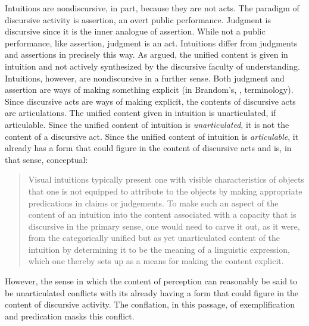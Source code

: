 \documentclass[12pt]{article}
\begin{document}
Intuitions are nondiscursive, in part, because they are not acts. The paradigm of discursive activity is assertion, an overt public performance. Judgment is discursive since it is the inner analogue of assertion. While not a public performance, like assertion, judgment is an act. Intuitions differ from judgments and assertions in precisely this way. As \citet[chapter 9]{Prichard:1909yg} argued, the unified content is given in intuition and not actively synthesized by the discursive faculty of understanding. Intuitions, however, are nondiscursive in a further sense. Both judgment and assertion are ways of making something explicit (in Brandom's, \citeyear{Brandom:1994fk}, terminology). Since discursive acts are ways of making explicit, the contents of discursive acts are articulations. The unified content given in intuition is unarticulated, if articulable. Since the unified content of intuition is \emph{unarticulated}, it is not the content of a discursive act. Since the unified content of intuition is \emph{articulable}, it already has a form that could figure in the content of discursive acts and is, in that sense, conceptual:
\begin{quote}
	Visual intuitions typically present one with visible characteristics of objects that one is not equipped to attribute to the objects by making appropriate predications in claims or judgements. To make such an aspect of the content of an intuition into the content associated with a capacity that is discursive in the primary sense, one would need to carve it out, as it were, from the categorically unified but as yet unarticulated content of the intuition by determining it to be the meaning of a linguistic expression, which one thereby sets up as a means for making the content explicit.
\end{quote}
However, the sense in which the content of perception can reasonably be said to be unarticulated conflicts with its already having a form that could figure in the content of discursive activity. The conflation, in this passage, of exemplification and predication masks this conflict.
\end{document}
